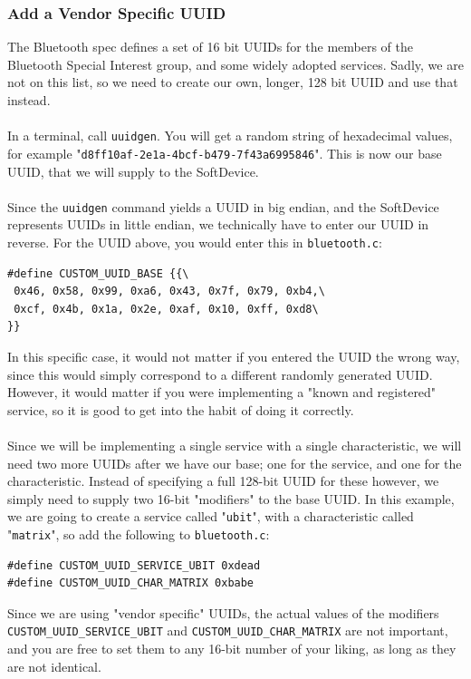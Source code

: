 \documentclass[11pt,a4paper]{article}
\begin{document}
\subsubsection{Add a Vendor Specific UUID}
The Bluetooth spec defines a set of 16 bit UUIDs for the members of the Bluetooth Special Interest group, and some widely adopted services. Sadly, we are not on this list, so we need to create our own, longer, 128 bit UUID and use that instead.\\
\\
In a terminal, call \texttt{uuidgen}. You will get a random string of hexadecimal values, for example "\texttt{d8ff10af-2e1a-4bcf-b479-7f43a6995846}". This is now our base UUID, that we will supply to the SoftDevice.\\
\\
Since the \texttt{uuidgen} command yields a UUID in big endian, and the SoftDevice represents UUIDs in little endian, we technically have to enter our UUID in reverse. For the UUID above, you would enter this in \texttt{bluetooth.c}:
\begin{verbatim}
#define CUSTOM_UUID_BASE {{\
 0x46, 0x58, 0x99, 0xa6, 0x43, 0x7f, 0x79, 0xb4,\
 0xcf, 0x4b, 0x1a, 0x2e, 0xaf, 0x10, 0xff, 0xd8\
}}
\end{verbatim}
In this specific case, it would not matter if you entered the UUID the wrong way, since this would simply correspond to a different randomly generated UUID. However, it would matter if you were implementing a "known and registered" service, so it is good to get into the habit of doing it correctly.\\
\\
Since we will be implementing a single service with a single characteristic, we will need two more UUIDs after we have our base; one for the service, and one for the characteristic. Instead of specifying a full 128-bit UUID for these however, we simply need to supply two 16-bit "modifiers" to the base UUID. In this example, we are going to create a service called "\texttt{ubit}", with a characteristic called "\texttt{matrix}", so add the following to \texttt{bluetooth.c}:
\begin{verbatim}
#define CUSTOM_UUID_SERVICE_UBIT 0xdead
#define CUSTOM_UUID_CHAR_MATRIX 0xbabe
\end{verbatim}
Since we are using "vendor specific" UUIDs, the actual values of the modifiers \texttt{CUSTOM_UUID_SERVICE_UBIT} and \texttt{CUSTOM_UUID_CHAR_MATRIX} are not important, and you are free to set them to any 16-bit number of your liking, as long as they are not identical.\\
\end{document}
